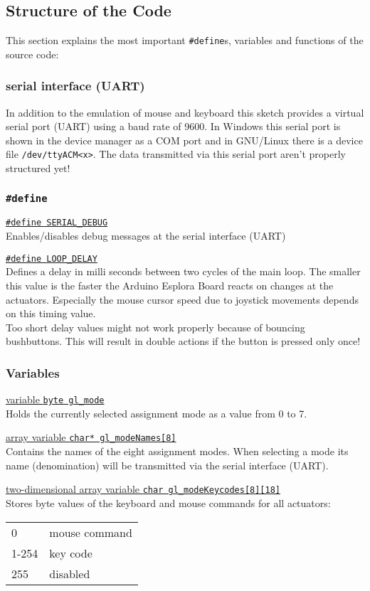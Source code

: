\subsection{Structure of the Code}
This section explains the most important \texttt{\#define}s, variables
and functions of the source code:

\subsubsection*{serial interface (UART)}
In addition to the emulation of mouse and keyboard this sketch provides
a virtual serial port (UART) using a baud rate of 9600. In Windows this
serial port is shown in the device manager as a COM port and in
GNU/Linux there is a device file \texttt{/dev/ttyACM<x>}. The data transmitted via this serial port aren't
properly structured yet!

\subsubsection*{\texttt{\#define}}
\uline{\texttt{\#define SERIAL\_DEBUG}}\\
Enables/disables debug messages at the serial interface (UART)

\uline{\texttt{\#define LOOP\_DELAY}}\\
Defines a delay in milli seconds between two cycles of the main loop.
The smaller this value is the faster the Arduino Esplora Board reacts on
changes at the actuators. Especially the mouse cursor speed due to
joystick movements depends on this timing value.\\
Too short delay values might not work properly because of bouncing
bushbuttons. This will result in double actions if the button is pressed
only once!

\subsubsection*{Variables}
\uline{variable \texttt{byte gl\_mode}}\\
Holds the currently selected assignment mode as a value from 0 to 7.

\uline{array variable \texttt{char* gl\_modeNames[8]}}\\
Contains the names of the eight assignment modes. When selecting a mode
its name (denomination) will be transmitted via the serial interface
(UART).

\uline{two-dimensional array variable \texttt{char gl\_modeKeycodes[8][18]}}\\
Stores byte values of the keyboard and mouse commands for all
actuators:\\
\begin{tabular}{ll}
0		&	mouse command\\
1-254	&	key code\\
255		&	disabled\\
\end{tabular}

